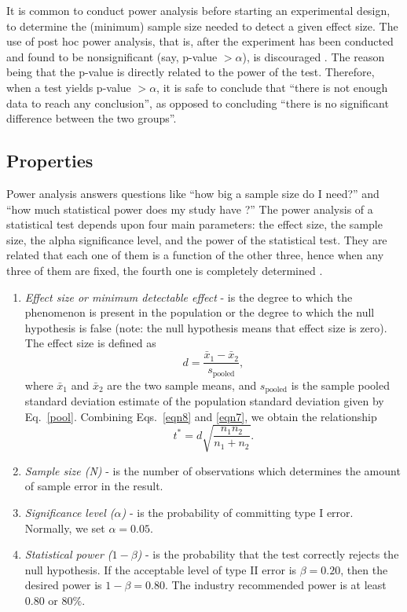 \documentclass[10pt, aps,twocolumn, superscriptaddress, nofootinbib]{revtex4-2}
\begin{document}
It is common to conduct power analysis before starting an experimental design, to determine the (minimum) sample size needed to detect a given effect size. The use of post hoc power analysis, that is,  after the experiment has been conducted and found to be nonsignificant (say, p-value $> \alpha$), is discouraged \cite{s10}. The reason being that the p-value is directly related to the power of the test. Therefore, when a test yields p-value $> \alpha$, it is safe to conclude that ``there is not enough data to reach any conclusion'', as opposed to concluding  ``there is no significant difference between the two groups''.
 
 \subsection{Properties}
 
 Power analysis answers questions like ``how big a sample size do I need?'' and ``how much statistical power does my study have  \cite{s5,s9}?''  The power analysis of a statistical test depends upon four main parameters: the effect size, the sample size, the alpha significance level, and the power of the statistical test. They are related that each one of them is a function of the other three, hence when any three of them are fixed, the fourth one is completely determined \cite{s5}.
 
 
 \begin{enumerate}
 	\item \textit{Effect size or minimum detectable effect} - is the degree to which the phenomenon is present in the population or the degree to which the null hypothesis is false (note: the null hypothesis means that effect size is zero). The effect size is defined as
 \begin{equation}
 	d =\frac{\bar{x}_1 -\bar{x}_2}{s_{\text{pooled}}},
 	\label{eqn7}
 \end{equation}
 where $\bar{x}_1$ and $\bar{x}_2$ are the two sample means, and $s_{\text{pooled}}$ is the sample pooled standard deviation estimate of the population standard deviation given by Eq.~\eqref{pool}. Combining Eqs.~\eqref{eqn8} and \eqref{eqn7}, we obtain the relationship
\begin{equation}
	t^* = d\sqrt{\frac{n_1n_2}{n_1+n_2}}.
\end{equation}

 	\item \textit{Sample size (N)} - is the number of observations which determines the amount of sample error in the result.
	
 	\item \textit{Significance level ($\alpha$)} - is the probability of committing type I error. Normally, we set  $\alpha =0.05$.

 	\item \textit{Statistical power ($1-\beta$)} - is the probability that the test correctly rejects the null hypothesis. If the acceptable level of type II error is $\beta = 0.20$, then the desired power is $1-\beta = 0.80$. The industry recommended power is at least $0.80$ or $80\%$.
 \end{enumerate}
\end{document}
